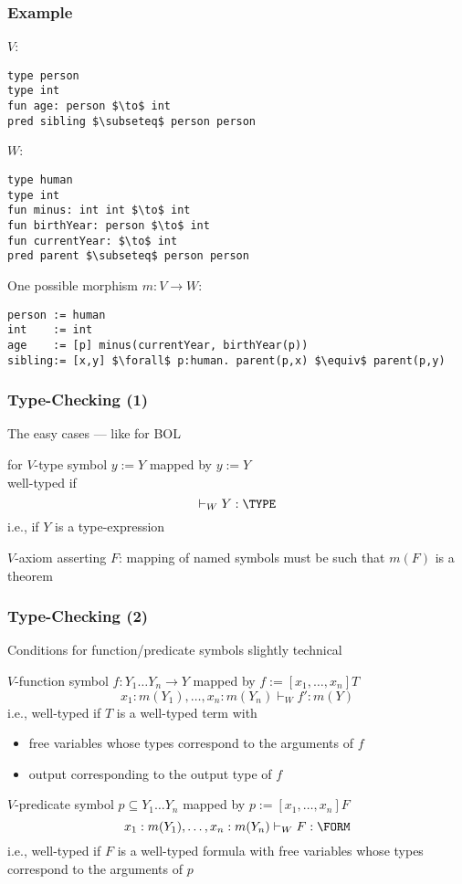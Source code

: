 \begin{frame}[fragile]\frametitle{Example}
$V$:
\begin{lstlisting}[basicstyle={\footnotesize\color{gray}}]
type person
type int
fun age: person $\to$ int
pred sibling $\subseteq$ person person
\end{lstlisting}

$W$:
\begin{lstlisting}[basicstyle={\footnotesize\color{gray}}]
type human
type int
fun minus: int int $\to$ int
fun birthYear: person $\to$ int
fun currentYear: $\to$ int
pred parent $\subseteq$ person person
\end{lstlisting}

One possible morphism $m:V\to W$:
\begin{lstlisting}[basicstyle={\footnotesize\color{gray}}]
person := human
int    := int
age    := [p] minus(currentYear, birthYear(p))
sibling:= [x,y] $\forall$ p:human. parent(p,x) $\equiv$ parent(p,y)
\end{lstlisting}
\end{frame}

\begin{frame}\frametitle{Type-Checking (1)}
\begin{blockitems}{The easy cases --- like for BOL}
\item for $V$-type symbol $y:=Y$ mapped by $y:=Y$ \\
well-typed if
 \[\vdash_W Y: \TYPE\]
i.e., if $Y$ is a type-expression
\item $V$-axiom asserting $F$: mapping of named symbols must be such that $m(F)$ is a theorem
\end{blockitems}
\end{frame}

\begin{frame}\frametitle{Type-Checking (2)}
\begin{blockitems}{Conditions for function/predicate symbols slightly technical}
\item $V$-function symbol $f:Y_1 \ldots Y_n\to Y$ mapped by $f:=[x_1,\ldots,x_n]T$\\
 \[x_1:m(Y_1),\ldots,x_n:m(Y_n)\vdash_W f': m(Y)\]
i.e., well-typed if $T$ is a well-typed term with
 \begin{itemize}
  \item free variables whose types correspond to the arguments of $f$
  \item output corresponding to the output type of $f$
 \end{itemize}
\item $V$-predicate symbol $p\subseteq Y_1\ldots Y_n$ mapped by $p:=[x_1,\ldots,x_n]F$
 \[x_1:m(Y_1),\ldots,x_n:m(Y_n)\vdash_W F: \FORM\]
i.e., well-typed if $F$ is a well-typed formula with free variables whose types correspond to the arguments of $p$
\end{blockitems}
\end{frame}


